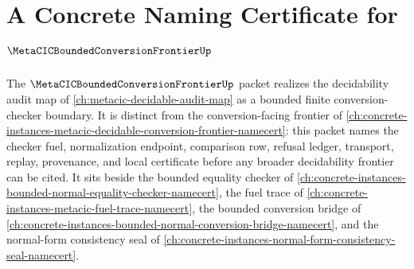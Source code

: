 \chapter{A Concrete Naming Certificate for $\MetaCICBoundedConversionFrontierUp$}
\label{ch:concrete-instances-metacic-bounded-conversion-frontier-namecert}

The $\MetaCICBoundedConversionFrontierUp$ packet realizes the decidability audit map of \autoref{ch:metacic-decidable-audit-map} as a bounded finite conversion-checker boundary. It is distinct from the conversion-facing frontier of \autoref{ch:concrete-instances-metacic-decidable-conversion-frontier-namecert}: this packet names the checker fuel, normalization endpoint, comparison row, refusal ledger, transport, replay, provenance, and local certificate before any broader decidability frontier can be cited. It sits beside the bounded equality checker of \autoref{ch:concrete-instances-bounded-normal-equality-checker-namecert}, the fuel trace of \autoref{ch:concrete-instances-metacic-fuel-trace-namecert}, the bounded conversion bridge of \autoref{ch:concrete-instances-bounded-normal-conversion-bridge-namecert}, and the normal-form consistency seal of \autoref{ch:concrete-instances-normal-form-consistency-seal-namecert}.



